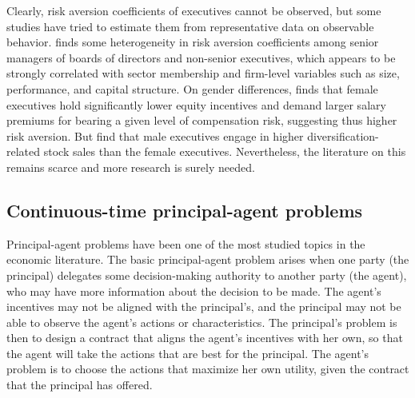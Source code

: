     Clearly, risk aversion coefficients of executives cannot be observed, but some studies have tried to estimate them from representative data on observable behavior. \cite{brenner2015risk} finds some heterogeneity in risk aversion coefficients among senior managers of boards of directors and non-senior executives, which appears to be strongly correlated with sector membership and firm-level variables such as size, performance, and capital structure. On gender differences, \cite{carter2017executive} finds that female executives hold significantly lower equity incentives and demand larger salary premiums for bearing a given level of compensation risk, suggesting thus higher risk aversion. But \cite{iqbal2006female} find that male executives engage in higher diversification-related stock sales than the female executives. Nevertheless, the literature on this remains scarce and more research is surely needed.

\subsection{Continuous-time principal-agent problems} %
    Principal-agent problems have been one of the most studied topics in the economic literature. The basic principal-agent problem arises when one party (the principal) delegates some decision-making authority to another party (the agent), who may have more information about the decision to be made. The agent's incentives may not be aligned with the principal's, and the principal may not be able to observe the agent's actions or characteristics. The principal's problem is then to design a contract that aligns the agent's incentives with her own, so that the agent will take the actions that are best for the principal. The agent's problem is to choose the actions that maximize her own utility, given the contract that the principal has offered. 

